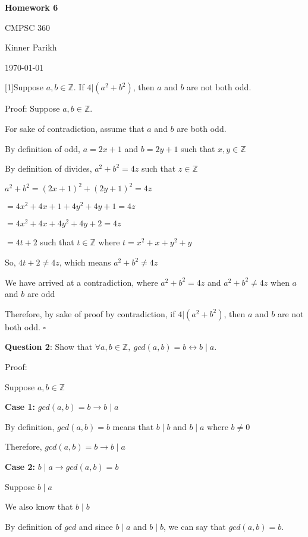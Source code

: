 \documentclass{article} %
\newcommand{\question}[2][]{\begin{flushleft}
        \textbf{Question #1}: #2
\end{flushleft}}
\newcommand{\maketitletwo}[2][]{\begin{center}
        \Large{\textbf{Homework #1}
            
            CMPSC 360} %
        \vspace{5pt}
        
        \normalsize{Kinner Parikh  %
        
        \today}        %
        \vspace{15pt}
        
\end{center}}
\begin{document}
    \maketitletwo[6]  %
    
    \question[1]{Suppose $a, b \in \mathbb{Z}$. If $4 | (a^2 + b^2)$, then $a$ and $b$ are not both odd.}

    Proof: Suppose $a, b \in \mathbb{Z}$.

    For sake of contradiction, assume that $a$ and $b$ are both odd.

    By definition of odd, $a = 2x + 1$ and $b = 2y + 1$ such that $x,y \in \mathbb{Z}$

    By definition of divides, $a^2 + b^2 = 4z$ such that $z \in \mathbb{Z}$

    \vspace*{0.1cm}

    $a^2 + b^2 = (2x + 1)^2 + (2y + 1)^2 = 4z$

    \tabto*{1.7cm} $= 4x^2 + 4x + 1 + 4y^2 + 4y + 1 = 4z$

    \tabto*{1.7cm} $= 4x^2 + 4x + 4y^2 + 4y + 2 = 4z$

    \tabto*{1.7cm} $= 4t + 2$ such that $t \in \mathbb{Z}$ where $t = x^2 + x + y^2 + y$

    So, $4t + 2 \neq 4z$, which means $a^2 + b^2 \neq 4z$

    We have arrived at a contradiction, where $a^2 + b^2 = 4z$ and $a^2 + b^2 \neq 4z$ when $a$ and $b$ are odd

    Therefore, by sake of proof by contradiction, if $4 | (a^2 + b^2)$, then $a$ and $b$ are not both odd. $\square$

    \question[2]{Show that $\forall a,b \in \mathbb{Z},\ gcd(a, b) = b \leftrightarrow b \mid a. $}

    Proof:
    
    Suppose $a, b \in \mathbb{Z}$

    \textbf{Case 1:} $gcd(a, b) = b \rightarrow b \mid a$

    \tabto{1cm} By definition, $gcd(a, b) = b$ means that $b \mid b$ and $b \mid a$ where $b \neq 0$

    \tabto{1cm} Therefore, $gcd(a, b) = b \rightarrow b \mid a$

    \textbf{Case 2:} $b \mid a \rightarrow gcd(a, b) = b $

    \tabto{1cm} Suppose $b \mid a$

    \tabto{1cm} We also know that $b \mid b$

    \tabto{1cm} By definition of $gcd$ and since $b \mid a$ and $b \mid b$, we can say that $gcd(a, b) = b$.
\end{document}
